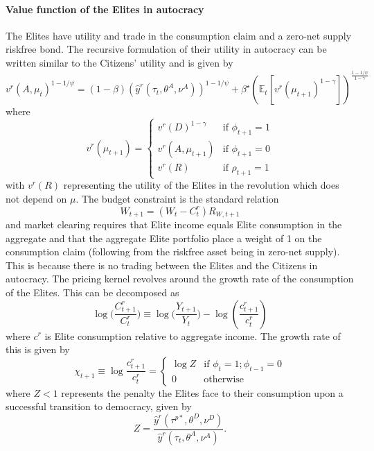 \paragraph{Value function of the Elites in autocracy}

The Elites have \citeauthor{Epstein1989} utility and trade in the consumption claim and a zero-net supply riskfree bond. The recursive formulation of their utility in autocracy can be written similar to the Citizens' utility and is given by
\begin{equation}
	v^{r}(A,\mu_{t})^{1-1/\psi}=(1-\beta)(\hat{y}^{r} (\tau_t,\theta^{A},\nu^A))^{1-1/\psi}+\beta^{\star}\left(\mathbb{E}_{t}\left[v^r(\mu_{t+1})^{1-\gamma}\right]\right)^{\frac{1-1/\psi}{1-\gamma}}
\end{equation}
where
\begin{equation*}
v^r(\mu_{t+1})=\begin{cases}
v^{r}(D)^{1-\gamma} & \text{if } \phi_{t+1} = 1 \\
v^{r}(A,\mu_{t+1}) & \text{if }\phi_{t+1} = 0 \\
v^r(R) & \text{if }\rho_{t+1} = 1
\end{cases}
\end{equation*}
with $v^r(R)$ representing the utility of the Elites in the revolution which does not depend on $\mu$. The budget constraint is the standard relation
\begin{equation}
W_{t+1} = (W_t-C_t^r)R_{W,t+1}
\label{eq:budgetconstraint_ez}
\end{equation}
and market clearing requires that Elite income equals Elite consumption in the aggregate and that the aggregate Elite portfolio place a weight of 1 on the consumption claim (following from the riskfree asset being in zero-net supply). This is because there is no trading between the Elites and the Citizens in autocracy. The pricing kernel revolves around the growth rate of the consumption of the Elites. This can be decomposed as
\begin{equation}
\log \bigg(\frac{C_{t+1}^r}{C_{t}^r} \bigg) \equiv \log \bigg(\frac{Y_{t+1}}{Y_{t}}\bigg)- \log\left(\frac{c_{t+1}^{r}}{c_{t}^{r}}\right)
\end{equation}
where $c^r$ is Elite consumption relative to aggregate income. The growth rate of this is given by
\begin{equation}
 \chi_{t+1} \equiv \log \frac{c_{t+1}^{r}}{c_{t}^{r}} = \begin{cases} 
\log Z & \textrm{if }\phi_{t}=1;\phi_{t-1}=0 \\
0 & \textrm{otherwise}
\end{cases} 
\end{equation}
where $Z<1$ represents the penalty the Elites face to their consumption upon a successful transition to democracy, given by
\begin{equation}
	Z= \frac{\hat{y}^{r} (\tau^{p*},\theta^{D},\nu^D)}{\hat{y}^{r} (\tau_t,\theta^{A},\nu^A)}.
\end{equation}

